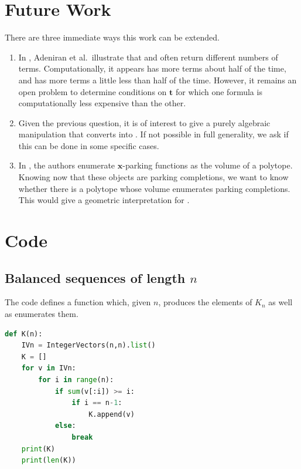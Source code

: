 \documentclass{amsart}
\theoremstyle{definition}
\numberwithin{equation}{section}
\begin{document}
\section{Future Work}\label{sec:future_work_short_paper}
There are three immediate ways this work can be extended.
\begin{enumerate}
    \item 
    In \cite[Section 5]{bib:ParkingCompletions}, Adeniran et al.\ illustrate that  and  often return different numbers of terms.
    Computationally, it appears  has more terms about half of the time, and  has more terms a little less than half of the time. 
    However, it remains an open problem to determine conditions on $\mathbf{t}$ for which one formula is computationally less expensive than the other. 
    
    \item Given the previous question, it is of interest to give a purely algebraic manipulation that converts  into . 
    If not possible in full generality, we ask if this can be done in some specific cases.

    
    \item In \cite{bib:PitmanStanley}, the authors enumerate $\mathbf{x}$-parking functions as the volume of a polytope.
    Knowing now that these objects are parking completions, we want to know whether there is a polytope whose volume enumerates parking completions. 
    This would give a geometric interpretation for . 
\end{enumerate}

\newpage

  

% 

\appendix
\section{Code}\label{sec:appendix_code}
\subsection{Balanced sequences of length $n$}\label{sec:appendix_code_for_K_n_short_paper}
The code defines a function which, given $n$, produces the elements of $K_n$ as well as enumerates them.
\begin{lstlisting}[language=Python]
    def K(n):
    IVn = IntegerVectors(n,n).list()
    K = []
    for v in IVn:
        for i in range(n):
            if sum(v[:i]) >= i:
                if i == n-1:
                    K.append(v)
            else:
                break
    print(K)
    print(len(K))
\end{lstlisting}
\end{document}
